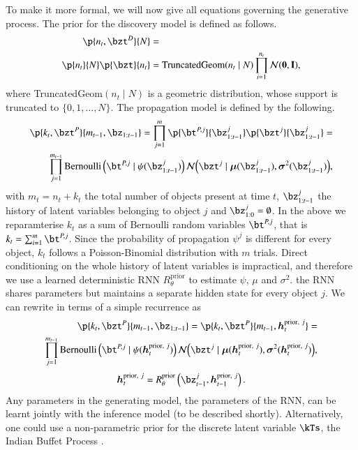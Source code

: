 To make it more formal, we will now give all equations governing the generative process. The prior for the discovery model is defined as follows.
\begin{equation}
\begin{aligned}
    \p{n_t, \bzt^D}{N} &=\\
    \p{n_t}{N} \p{\bzt}{n_t} &= \mathrm{TruncatedGeom} (n_t \mid N) \prod_{i=1}^{n_t} \gauss{\bf{0}, I},
\end{aligned}
\end{equation}
where TruncatedGeom$(n_t \mid N)$ is a geometric distribution, whose support is truncated to $\{0, 1, \dots, N\}$. The propagation model is defined by the following.
\begin{equation}
\begin{aligned}
    \p{k_t, \bzt^P}{m_{t-1}, \bz_{1:t-1}} = \prod_{j=1}^m \p{\bt^{P, j}}{\bz_{1:t-1}^j} \p{\bzt^j}{\bz_{1:t-1}^j} =\\
    \prod_{j=1}^{m_{t-1}} \mathrm{Bernoulli} \left(\bt^{P, j} \mid \psi( \bz_{1:t-1}^j) \right) \gauss{\bzt^j \mid \bm{\mu} (\bz_{1:t-1}^j), \bm{\sigma}^2(\bz_{1:t-1}^j)},
\end{aligned}
\label{eq:prop_prior}
\end{equation}
with $m_t = n_t + k_t$ the total number of objects present at time $t$, $\bz_{1:t-1}^j$ the history of latent variables belonging to object $j$ and $\bz_{1:0}^j = \emptyset$. In the above we reparamterise $k_t$ as a sum of Bernoulli random variables $\bt^{P, j}$, that is $k_t = \sum_{i=1}^m \bt^{P, j}$. Since the probability of propagation $\psi^j$ is different for every object, $k_t$ follows a Poisson-Binomial distribution with $m$ trials. Direct conditioning on the whole history of latent variables is impractical, and therefore we use a learned deterministic RNN $R_\theta^\mathrm{prior}$ to estimate $\psi$, $\mu$ and $\sigma^2$. the RNN shares parameters but maintains a separate hidden state for every object $j$. We can rewrite  in terms of a simple recurrence as
\begin{equation}
\begin{aligned}
    \p{k_t, \bzt^P}{m_{t-1}, \bz_{1:t-1}} = \p{k_t, \bzt^P}{m_{t-1}, \bm{h}_t^{\mathrm{prior},\ j}} =\\
    \prod_{j=1}^{m_{t-1}} \mathrm{Bernoulli} \left(\bt^{P, j} \mid \psi( \bm{h}_t^{\mathrm{prior},\ j} ) \right) \gauss{\bzt^j \mid \bm{\mu} (\bm{h}_t^{\mathrm{prior},\ j}), \bm{\sigma}^2(\bm{h}_t^{\mathrm{prior},\ j})},
\end{aligned}
\end{equation}
\begin{equation}
    \bm{h}_t^{\mathrm{prior},\ j} = R_\theta^\mathrm{prior} \left( \bz_{t-1}^j, \bm{h}_{t-1}^{\mathrm{prior},\ j} \right).
\end{equation}
Any parameters in the generating model, \eg the parameters of the RNN, can be learnt jointly with the inference model (to be described shortly).
Alternatively, one could use a non-parametric prior for the discrete latent variable $\kTs$, \eg the Indian Buffet Process \citep{Gael2009}. 

